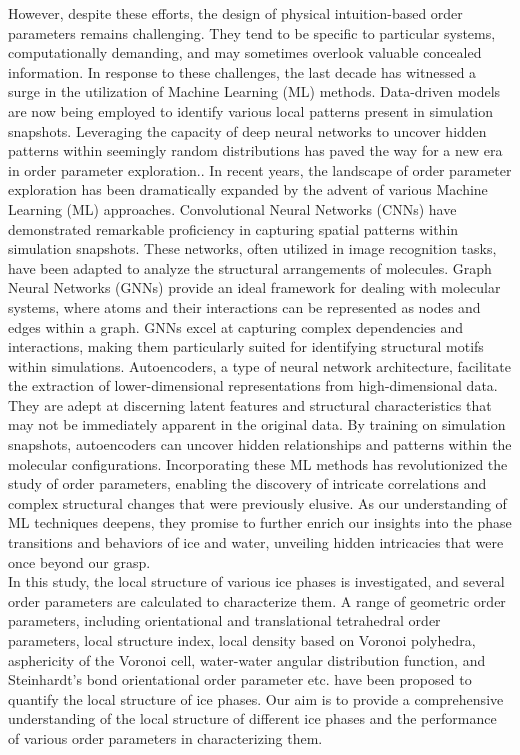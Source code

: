 However, despite these efforts, the design of physical intuition-based order parameters remains challenging. They tend to be specific to particular systems, computationally demanding, and may sometimes overlook valuable concealed information\cite{Donkor2023}\cite{Fulford2019}\cite{Doi2021}. In response to these challenges, the last decade has witnessed a surge in the utilization of Machine Learning (ML) methods. Data-driven models are now being employed to identify various local patterns present in simulation snapshots. Leveraging the capacity of deep neural networks to uncover hidden patterns within seemingly random distributions has paved the way for a new era in order parameter exploration..   
In recent years, the landscape of order parameter exploration has been dramatically expanded by the advent of various Machine Learning (ML) approaches\cite{ML_Method1}\cite{Cheng2019}. Convolutional Neural Networks (CNNs) have demonstrated remarkable proficiency in capturing spatial patterns within simulation snapshots\cite{Li2022}. These networks, often utilized in image recognition tasks, have been adapted to analyze the structural arrangements of molecules.
Graph Neural Networks (GNNs) provide an ideal framework for dealing with molecular systems, where atoms and their interactions can be represented as nodes and edges within a graph. GNNs excel at capturing complex dependencies and interactions, making them particularly suited for identifying structural motifs within simulations\cite{Hofstetter2022}\cite{Kim2020}.
Autoencoders, a type of neural network architecture, facilitate the extraction of lower-dimensional representations from high-dimensional data. They are adept at discerning latent features and structural characteristics that may not be immediately apparent in the original data. By training on simulation snapshots, autoencoders can uncover hidden relationships and patterns within the molecular configurations\cite{Kim2020}.
Incorporating these ML methods has revolutionized the study of order parameters, enabling the discovery of intricate correlations and complex structural changes that were previously elusive. As our understanding of ML techniques deepens, they promise to further enrich our insights into the phase transitions and behaviors of ice and water, unveiling hidden intricacies that were once beyond our grasp.\\
In this study, the local structure of various ice phases is investigated, and several order parameters are calculated to characterize them. A range of geometric order parameters, including orientational and translational tetrahedral order parameters, local structure index, local density based on Voronoi polyhedra, asphericity of the Voronoi cell, water-water angular distribution function, and Steinhardt’s bond orientational order parameter etc. have been proposed to quantify the local structure of ice phases. Our aim is to provide a comprehensive understanding of the local structure of different ice phases and the performance of various order parameters in characterizing them.


